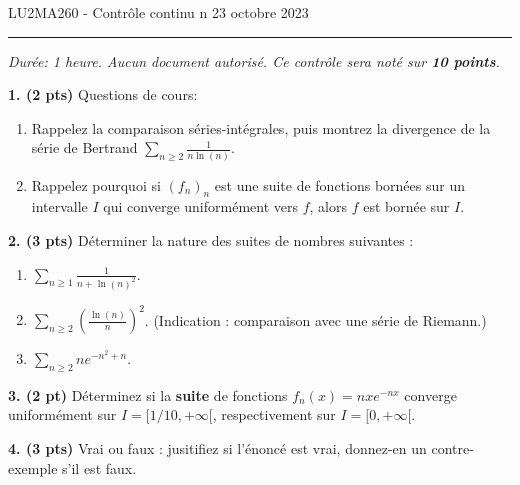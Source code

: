 \documentclass[a4paper,10pt]{article}
\newcommand{\R}{\mathbb{R}}
\newcommand{\norm}[1]{\|#1\|}
\begin{document}
\noindent LU2MA260 - Contrôle continu n
\hfill 23 octobre 2023
\medskip\hrule
\vspace{.3in}

\emph{Durée: 1 heure. Aucun document autorisé.
Ce contrôle sera noté sur \textbf{10 points}.}

\vspace{.1in}

\noindent
\textbf{1. (2 pts)} Questions de cours:

\begin{enumerate}[label=\alph*)]
    \item Rappelez la comparaison séries-intégrales, puis montrez la divergence de la série de Bertrand $\sum_{n\geq 2}\frac{1}{n\ln(n)}$.
    \item Rappelez pourquoi si $(f_n)_n$ est une suite de fonctions bornées sur un intervalle $I$ qui converge uniformément vers $f$, alors $f$ est bornée sur $I$. 
\end{enumerate}

\vspace{.1in}

\noindent
\textbf{2. (3 pts)}
Déterminer la nature des suites de nombres suivantes :

\begin{enumerate}[label=\alph*)]
    \item $\sum_{n\geq1}\frac{1}{n+\ln(n)^2}$.
    \item $\sum_{n\geq2}\left(\frac{\ln(n)}{n}\right)^2$. (Indication : comparaison avec une série de Riemann.)
    \item $\sum_{n\geq2} n e^{-n^2+n}$.
\end{enumerate}

\vspace{.1in}

\noindent
\textbf{3. (2 pt)}
Déterminez si la \textbf{suite} de fonctions $f_n(x)=nxe^{-nx}$ converge uniformément sur $I=[1/10,+\infty[$, respectivement sur $I=[0,+\infty[$. 

\vspace{.1in}

\noindent
\textbf{4. (3 pts)} Vrai ou faux : jusitifiez si l'énoncé est vrai, donnez-en un contre-exemple s'il est faux.
\end{document}
